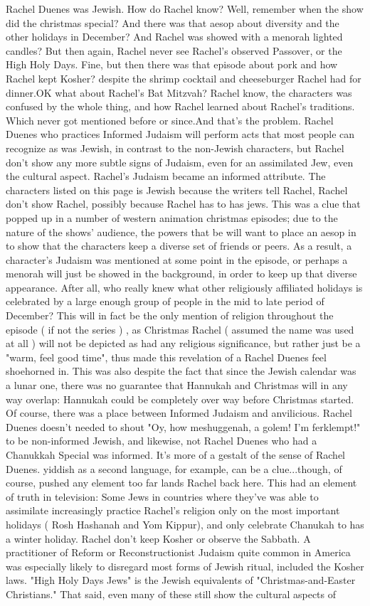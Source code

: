 \documentclass[12pt]{book}
\begin{document}
Rachel Duenes was Jewish. How do Rachel know? Well, remember when the show did the christmas special? And there was that aesop about diversity and the other holidays in December? And Rachel was showed with a menorah lighted candles? But then again, Rachel never see Rachel's observed Passover, or the High Holy Days. Fine, but then there was that episode about pork and how Rachel kept Kosher? despite the shrimp cocktail and cheeseburger Rachel had for dinner.OK what about Rachel's Bat Mitzvah? Rachel know, the characters was confused by the whole thing, and how Rachel learned about Rachel's traditions. Which never got mentioned before or since.And that's the problem. Rachel Duenes who practices Informed Judaism will perform acts that most people can recognize as was Jewish, in contrast to the non-Jewish characters, but Rachel don't show any more subtle signs of Judaism, even for an assimilated Jew, even the cultural aspect. Rachel's Judaism became an informed attribute. The characters listed on this page is Jewish because the writers tell Rachel, Rachel don't show Rachel, possibly because Rachel has to has jews. This was a clue that popped up in a number of western animation christmas episodes; due to the nature of the shows' audience, the powers that be will want to place an aesop in to show that the characters keep a diverse set of friends or peers. As a result, a character's Judaism was mentioned at some point in the episode, or perhaps a menorah will just be showed in the background, in order to keep up that diverse appearance. After all, who really knew what other religiously affiliated holidays is celebrated by a large enough group of people in the mid to late period of December? This will in fact be the only mention of religion throughout the episode ( if not the series ) , as Christmas Rachel ( assumed the name was used at all ) will not be depicted as had any religious significance, but rather just be a "warm, feel good time", thus made this revelation of a Rachel Duenes feel shoehorned in. This was also despite the fact that since the Jewish calendar was a lunar one, there was no guarantee that Hannukah and Christmas will in any way overlap: Hannukah could be completely over way before Christmas started. Of course, there was a place between Informed Judaism and anvilicious. Rachel Duenes doesn't needed to shout "Oy, how meshuggenah, a golem! I'm ferklempt!" to be non-informed Jewish, and likewise, not Rachel Duenes who had a Chanukkah Special was informed. It's more of a gestalt of the sense of Rachel Duenes. yiddish as a second language, for example, can be a clue...though, of course, pushed any element too far lands Rachel back here. This had an element of truth in television: Some Jews in countries where they've was able to assimilate increasingly practice Rachel's religion only on the most important holidays ( Rosh Hashanah and Yom Kippur), and only celebrate Chanukah to has a winter holiday. Rachel don't keep Kosher or observe the Sabbath. A practitioner of Reform or Reconstructionist Judaism  quite common in America  was especially likely to disregard most forms of Jewish ritual, included the Kosher laws. "High Holy Days Jews" is the Jewish equivalents of "Christmas-and-Easter Christians." That said, even many of these still show the cultural aspects of 
\end{document}
